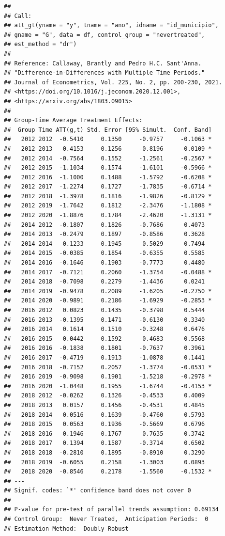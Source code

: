 \documentclass[portugues]{article}
\begin{document}
\begin{box_code}
\begin{verbatim}
## 
## Call:
## att_gt(yname = "y", tname = "ano", idname = "id_municipio", 
## gname = "G", data = df, control_group = "nevertreated",
## est_method = "dr") 
## 
## Reference: Callaway, Brantly and Pedro H.C. Sant'Anna.  
## "Difference-in-Differences with Multiple Time Periods." 
## Journal of Econometrics, Vol. 225, No. 2, pp. 200-230, 2021. 
## <https://doi.org/10.1016/j.jeconom.2020.12.001>, 
## <https://arxiv.org/abs/1803.09015>  
##
## Group-Time Average Treatment Effects:
##  Group Time ATT(g,t) Std. Error [95% Simult.  Conf. Band]  
##   2012 2012  -0.5410     0.1350     -0.9757     -0.1063 *
##   2012 2013  -0.4153     0.1256     -0.8196     -0.0109 *
##   2012 2014  -0.7564     0.1552     -1.2561     -0.2567 *
##   2012 2015  -1.1034     0.1574     -1.6101     -0.5966 *
##   2012 2016  -1.1000     0.1488     -1.5792     -0.6208 *
##   2012 2017  -1.2274     0.1727     -1.7835     -0.6714 *
##   2012 2018  -1.3978     0.1816     -1.9826     -0.8129 *
##   2012 2019  -1.7642     0.1812     -2.3476     -1.1808 *
##   2012 2020  -1.8876     0.1784     -2.4620     -1.3131 *
##   2014 2012  -0.1807     0.1826     -0.7686      0.4073  
##   2014 2013  -0.2479     0.1897     -0.8586      0.3628  
##   2014 2014   0.1233     0.1945     -0.5029      0.7494  
##   2014 2015  -0.0385     0.1854     -0.6355      0.5585  
##   2014 2016  -0.1646     0.1903     -0.7773      0.4480  
##   2014 2017  -0.7121     0.2060     -1.3754     -0.0488 *
##   2014 2018  -0.7098     0.2279     -1.4436      0.0241  
##   2014 2019  -0.9478     0.2089     -1.6205     -0.2750 *
##   2014 2020  -0.9891     0.2186     -1.6929     -0.2853 *
##   2016 2012   0.0823     0.1435     -0.3798      0.5444  
##   2016 2013  -0.1395     0.1471     -0.6130      0.3340  
##   2016 2014   0.1614     0.1510     -0.3248      0.6476  
##   2016 2015   0.0442     0.1592     -0.4683      0.5568  
##   2016 2016  -0.1838     0.1801     -0.7637      0.3961  
##   2016 2017  -0.4719     0.1913     -1.0878      0.1441  
##   2016 2018  -0.7152     0.2057     -1.3774     -0.0531 *
##   2016 2019  -0.9098     0.1901     -1.5218     -0.2978 *
##   2016 2020  -1.0448     0.1955     -1.6744     -0.4153 *
##   2018 2012  -0.0262     0.1326     -0.4533      0.4009  
##   2018 2013   0.0157     0.1456     -0.4531      0.4845  
##   2018 2014   0.0516     0.1639     -0.4760      0.5793  
##   2018 2015   0.0563     0.1936     -0.5669      0.6796  
##   2018 2016  -0.1946     0.1767     -0.7635      0.3742  
##   2018 2017   0.1394     0.1587     -0.3714      0.6502  
##   2018 2018  -0.2810     0.1895     -0.8910      0.3290  
##   2018 2019  -0.6055     0.2158     -1.3003      0.0893  
##   2018 2020  -0.8546     0.2178     -1.5560     -0.1532 *
## ---
## Signif. codes: `*' confidence band does not cover 0
## 
## P-value for pre-test of parallel trends assumption: 0.69134
## Control Group:  Never Treated,  Anticipation Periods:  0
## Estimation Method:  Doubly Robust

\end{verbatim}

\end{box_code}
\end{document}
